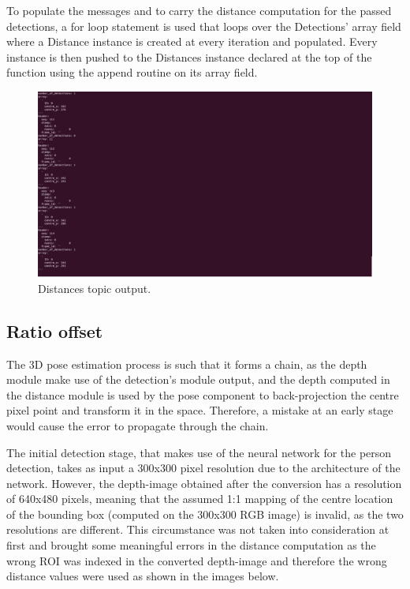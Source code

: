 To populate the messages and to carry the distance computation for the passed detections, a for loop statement is used that loops over the Detections' array field where a Distance instance is created at every iteration and populated. Every instance is then pushed to the Distances instance declared at the top of the function using the append routine on its array field.

\begin{figure}[H]
  \begin{center}
    \includegraphics[width=.8\linewidth]{images/chapter3_detections_topic.png}
  \end{center}
  \caption{Distances topic output.}
  \label{fig:distance_topic}
\end{figure}

\subsection{Ratio offset}

The 3D pose estimation process is such that it forms a chain, as the depth module make use of the detection's module output, and the depth computed in the distance module is used by the pose component to back-projection the centre pixel point and transform it in the space. Therefore, a mistake at an early stage would cause the error to propagate through the chain.

The initial detection stage, that makes use of the neural network for the person detection, takes as input a 300x300 pixel resolution due to the architecture of the network. However, the depth-image obtained after the conversion has a resolution of 640x480 pixels, meaning that the assumed 1:1 mapping of the centre location of the bounding box (computed on the 300x300 RGB image) is invalid, as the two resolutions are different. This circumstance was not taken into consideration at first and brought some meaningful errors in the distance computation as the wrong ROI was indexed in the converted depth-image and therefore the wrong distance values were used as shown in the images below.


